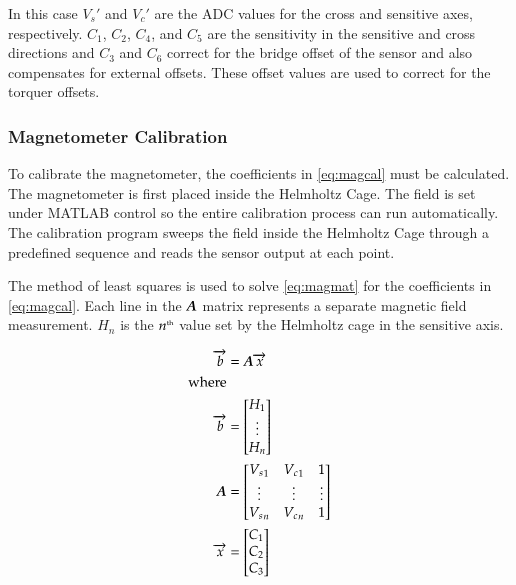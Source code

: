In this case $V_s'$ and $V_c'$ are the \ac{ADC} values for the cross and sensitive axes, respectively. $C_1$, $C_2$, $C_4$, and $C_5$ are the sensitivity in the sensitive and cross directions and $C_3$ and $C_6$ correct for the bridge offset of the sensor and also compensates for external offsets. These offset values are used to correct for the torquer offsets.

\subsubsection{Magnetometer Calibration}
\label{sec:magcal}

To calibrate the magnetometer, the coefficients in \cref{eq:magcal} must be calculated. The magnetometer is first placed inside the Helmholtz Cage. The field is set under MATLAB control so the entire calibration process can run automatically. The calibration program sweeps the field inside the Helmholtz Cage through a predefined sequence and reads the sensor output at each point. 

The method of least squares is used to solve \cref{eq:magmat} for the coefficients in \cref{eq:magcal}. Each line in the $\boldsymbol{A}$ matrix represents a separate magnetic field measurement. $H_n$ is the $n^{\text{\tiny th}}$ value set by the Helmholtz cage in the sensitive axis. 

\begin{equation}
    \label{eq:magmat}
    \begin{split}
    \vect{b}&=\matt{A} \vect{x} \\
    {\text{\raggedright where}} \\
    \vect{b}&= 
    \begin{bmatrix}
        H_1 \\
        \vdots \\
        H_n \\
    \end{bmatrix} \\
    \matt{A}&=
    \begin{bmatrix}
        {V_s}_1 & {V_c}_1 & 1 \\
        \vdots & \vdots & \vdots\\
        {V_s}_n & {V_c}_n & 1 \\
    \end{bmatrix} \\
    \vect{x}&= 
    \begin{bmatrix}
        C_1 \\
        C_2 \\
        C_3 \\
    \end{bmatrix} 
    \end{split}
\end{equation}

